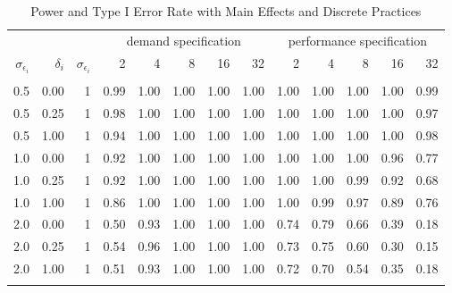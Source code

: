 \begin{table}

\caption{\label{tab:robustness-main-table}Power and Type I Error Rate with Main Effects and Discrete Practices}
\centering
\fontsize{8}{10}\selectfont
\begin{threeparttable}
\begin{tabular}[t]{rrrrrrrrrrrrr}
\toprule
\multicolumn{3}{c}{ } & \multicolumn{5}{c}{demand specification} & \multicolumn{5}{c}{performance specification} \\
\cmidrule(l{3pt}r{3pt}){4-8} \cmidrule(l{3pt}r{3pt}){9-13}
$\sigma_{\epsilon_i}$ & $\delta_i$ & $\sigma_{\epsilon_i}$ & 2 & 4 & 8 & 16 & 32 & 2 & 4 & 8 & 16 & 32\\
\midrule
\addlinespace[0.3em]
\multicolumn{13}{c}{\textbf{1 Discrete Practice - Power}}\\
\hspace{1em}0.5 & 0.00 & 1 & 0.99 & 1.00 & 1.00 & 1.00 & 1.00 & 1.00 & 1.00 & 1.00 & 1.00 & 0.99\\
\hspace{1em}0.5 & 0.25 & 1 & 0.98 & 1.00 & 1.00 & 1.00 & 1.00 & 1.00 & 1.00 & 1.00 & 1.00 & 0.97\\
\hspace{1em}0.5 & 1.00 & 1 & 0.94 & 1.00 & 1.00 & 1.00 & 1.00 & 1.00 & 1.00 & 1.00 & 1.00 & 0.98\\
\hspace{1em}1.0 & 0.00 & 1 & 0.92 & 1.00 & 1.00 & 1.00 & 1.00 & 1.00 & 1.00 & 1.00 & 0.96 & 0.77\\
\hspace{1em}1.0 & 0.25 & 1 & 0.92 & 1.00 & 1.00 & 1.00 & 1.00 & 1.00 & 1.00 & 0.99 & 0.92 & 0.68\\
\hspace{1em}1.0 & 1.00 & 1 & 0.86 & 1.00 & 1.00 & 1.00 & 1.00 & 1.00 & 0.99 & 0.97 & 0.89 & 0.76\\
\hspace{1em}2.0 & 0.00 & 1 & 0.50 & 0.93 & 1.00 & 1.00 & 1.00 & 0.74 & 0.79 & 0.66 & 0.39 & 0.18\\
\hspace{1em}2.0 & 0.25 & 1 & 0.54 & 0.96 & 1.00 & 1.00 & 1.00 & 0.73 & 0.75 & 0.60 & 0.30 & 0.15\\
\hspace{1em}2.0 & 1.00 & 1 & 0.51 & 0.93 & 1.00 & 1.00 & 1.00 & 0.72 & 0.70 & 0.54 & 0.35 & 0.18\\
\addlinespace[0.3em]
\multicolumn{13}{c}{\textbf{1 Discrete Practice - Type I}}\\

\end{tabular}
\end{threeparttable}
\end{table}

